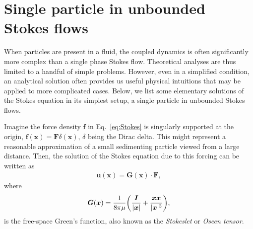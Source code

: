 \section{Single particle in unbounded Stokes flows}
\label{sec:single-p}

When particles are present in a fluid, the coupled dynamics is often significantly more complex than a single phase Stokes flow.
Theoretical analyses are thus limited to a handful of simple problems.
However, even in a simplified condition, an analytical solution often provides us useful physical intuitions that may be applied to more complicated cases.
Below, we list some elementary solutions of the Stokes equation in its simplest setup, \ie a single particle in unbounded Stokes flows.

\medskip
Imagine the force density ${\bm f}$ in Eq.\ \eqref{eq:Stokes} is singularly supported at the origin, \ie ${\bm f}({\bm x})={\bm F}\delta({\bm x})$, $\delta$ being the Dirac delta.
This might represent a reasonable approximation of a small sedimenting particle viewed from a large distance.
Then, the solution of the Stokes equation due to this forcing can be written as
\begin{equation} \label{eq:stokes-green}
 \begin{aligned}
   {\bm u}({\bm x}) = {\bm G}({\bm x}) \cdot {\bm F},
 \end{aligned}
\end{equation}
where  
\begin{equation} \label{eq:stokeslet}
 \begin{aligned}
   {\bm G}({\bm x}) = \frac{1}{8\pi\mu } \bigg( \frac{{\bm I}}{\lvert\bm x\rvert}+\frac{ {\bm x}{\bm x} }{ \lvert{\bm x}\rvert^3 } \bigg),
 \end{aligned}
\end{equation}
is the free-space Green's function, also known as the \emph{Stokeslet} or \emph{Oseen tensor}.

